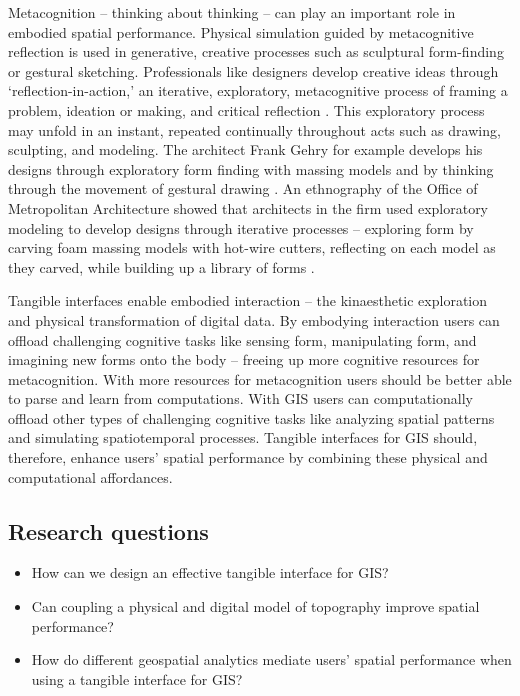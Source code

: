 \documentclass[prodmode,acmtochi]{acmsmall} %
\begin{document}
Metacognition -- thinking about thinking -- 
can play an important role in embodied spatial performance.
%
Physical simulation guided by metacognitive reflection 
is used in generative, creative processes 
such as sculptural form-finding or gestural sketching. 
%
Professionals like designers develop creative ideas through `reflection-in-action,' 
an iterative, exploratory, metacognitive process 
of framing a problem, ideation or making, and critical reflection \cite{Schon1983}.
This exploratory process may unfold in an instant, 
repeated continually throughout acts such as drawing, sculpting, and modeling. 
%
The architect Frank Gehry for example develops his designs through exploratory form finding with massing models
and by thinking through the movement of gestural drawing
\cite{Gehry2004,Pollack2006}.
%
An ethnography of the Office of Metropolitan Architecture
showed that architects in the firm used exploratory modeling
to develop designs through iterative processes
-- exploring form by carving foam massing models with hot-wire cutters, reflecting on each model as they carved, while building up a library of forms \cite{Yaneva2009}.

Tangible interfaces enable embodied interaction
-- the kinaesthetic exploration and physical transformation of digital data.
%
By embodying interaction
users can offload 
challenging cognitive tasks 
like sensing form, manipulating form, and imagining new forms 
onto the body
-- freeing up more cognitive resources for  
metacognition. 
%
With more resources for metacognition
users should be better able to parse and learn from computations.
%
With GIS users can computationally offload other types of challenging cognitive tasks 
like analyzing spatial patterns and simulating spatiotemporal processes.
%
Tangible interfaces for GIS should, therefore, enhance users' spatial performance 
by combining these physical and computational affordances.

\subsection{Research questions}

\begin{itemize}
\item How can we design an effective tangible interface for GIS?
\item Can coupling a physical and digital model of topography improve spatial performance?
\item How do different geospatial analytics mediate users' spatial performance when using a tangible interface for GIS?
\end{itemize}
\end{document}
